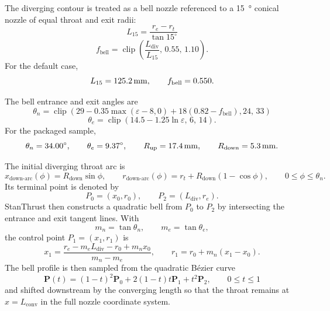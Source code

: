 \documentclass[11pt]{article}
\newcommand{\clip}{\operatorname{clip}}
\begin{document}
The diverging contour is treated as a bell nozzle referenced to a \SI{15}{\degree} conical nozzle of equal throat and exit radii:
\begin{equation}
L_{15}=\frac{r_e-r_t}{\tan 15^\circ}
\label{eq:l15}
\end{equation}
\begin{equation}
f_{\text{bell}}=\clip\!\left(\frac{L_{\text{div}}}{L_{15}},\,0.55,\,1.10\right).
\label{eq:bell-length-fraction}
\end{equation}
For the default case,
\[
L_{15}=\SI{125.2}{mm},
\qquad
f_{\text{bell}}=0.550.
\]

The bell entrance and exit angles are
\begin{equation}
\theta_n=
\clip\!\left(
29
-0.35\max(\varepsilon-8,0)
+18(0.82-f_{\text{bell}}),
24,\,
33
\right)
\label{eq:bell-entrance-angle}
\end{equation}
\begin{equation}
\theta_e=
\clip\!\left(
14.5-1.25\ln\varepsilon,\,
6,\,
14
\right).
\label{eq:bell-exit-angle}
\end{equation}
For the packaged sample,
\[
\theta_n=\SI{34.00}{\degree},
\qquad
\theta_e=\SI{9.37}{\degree},
\qquad
R_{\text{up}}=\SI{17.4}{mm},
\qquad
R_{\text{down}}=\SI{5.3}{mm}.
\]

The initial diverging throat arc is
\begin{equation}
x_{\text{down-arc}}(\phi)=R_{\text{down}}\sin\phi,
\qquad
r_{\text{down-arc}}(\phi)=r_t+R_{\text{down}}\left(1-\cos\phi\right),
\qquad 0\le \phi\le \theta_n.
\label{eq:diverging-arc}
\end{equation}
Its terminal point is denoted by
\[
P_0=(x_0,r_0),
\qquad
P_2=(L_{\text{div}},r_e).
\]
StanThrust then constructs a quadratic bell from $P_0$ to $P_2$ by intersecting the entrance and exit tangent lines. With
\[
m_n=\tan\theta_n,
\qquad
m_e=\tan\theta_e,
\]
the control point $P_1=(x_1,r_1)$ is
\begin{equation}
x_1=\frac{r_e-m_eL_{\text{div}}-r_0+m_nx_0}{m_n-m_e},
\qquad
r_1=r_0+m_n(x_1-x_0).
\label{eq:bell-control-point}
\end{equation}
The bell profile is then sampled from the quadratic B\'ezier curve
\begin{equation}
\mathbf{P}(t)=(1-t)^2\mathbf{P}_0+2(1-t)t\mathbf{P}_1+t^2\mathbf{P}_2,
\qquad 0\le t\le 1
\label{eq:bell-bezier}
\end{equation}
and shifted downstream by the converging length so that the throat remains at $x=L_{\text{conv}}$ in the full nozzle coordinate system.
\end{document}
